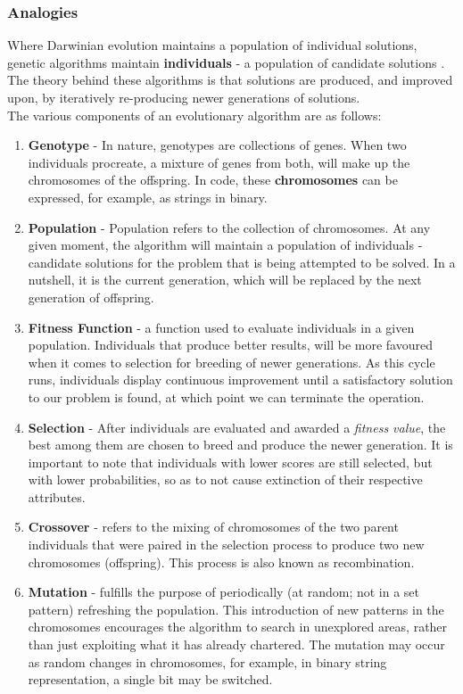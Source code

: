 \documentclass[conference,compsoc]{IEEEtran}
\begin{document}
\subsubsection{Analogies}
Where Darwinian evolution maintains a population of individual solutions, genetic algorithms maintain \textbf{individuals} - a population of candidate solutions \cite{Wiransky-GA}. The theory behind these algorithms is that solutions are produced, and improved upon, by iteratively re-producing newer generations of solutions.
\\
The various components of an evolutionary algorithm are as follows:
\begin{enumerate}
    \item \textbf{Genotype} - In nature, genotypes are collections of genes. When two individuals procreate, a mixture of genes from both, will make up the chromosomes of the offspring. In code, these \textbf{chromosomes} can be expressed, for example, as strings in binary. 
    \item \textbf{Population} - Population refers to the collection of chromosomes. At any given moment, the algorithm will maintain a population of individuals - candidate solutions for the problem that is being attempted to be solved. In a nutshell, it is the current generation, which will be replaced by the next generation of offspring. 
    \item \textbf{Fitness Function} - a function used to evaluate individuals in a given population. Individuals that produce better results, will be more favoured when it comes to selection for breeding of newer generations. As this cycle runs, individuals display continuous improvement until a satisfactory solution to our problem is found, at which point we can terminate the operation.
    \item \textbf{Selection} - After individuals are evaluated and awarded a \textit{fitness value}, the best among them are chosen to breed and produce the newer generation. It is important to note that individuals with lower scores are still selected, but with lower probabilities, so as to not cause extinction of their respective attributes.
    \item \textbf{Crossover} - refers to the mixing of chromosomes of the two parent individuals that were paired in the selection process to produce two new chromosomes (offspring). This process is also known as recombination.
    \item \textbf{Mutation} - fulfills the purpose of periodically (at random; not in a set pattern) refreshing the population. This introduction of new patterns in the chromosomes encourages the algorithm to search in unexplored areas, rather than just exploiting what it has already chartered. The mutation may occur as random changes in chromosomes, for example, in binary string representation, a single bit may be switched.
\end{enumerate}
\end{document}
